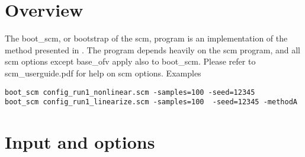 




\maketitle

\newcommand{\guidetoolname}{boot\_scm}

\section{Overview}

The boot\_scm, or bootstrap of the scm,
program is an implementation of the method presented in \cite{Keizer2}.
The program depends heavily on the scm program, and all scm options except base\_ofv
apply also to boot\_scm. Please refer to scm\_userguide.pdf for help on scm options.
Examples
\begin{verbatim}
boot_scm config_run1_nonlinear.scm -samples=100 -seed=12345
boot_scm config_run1_linearize.scm -samples=100  -seed=12345 -methodA
\end{verbatim}

\section{Input and options}
